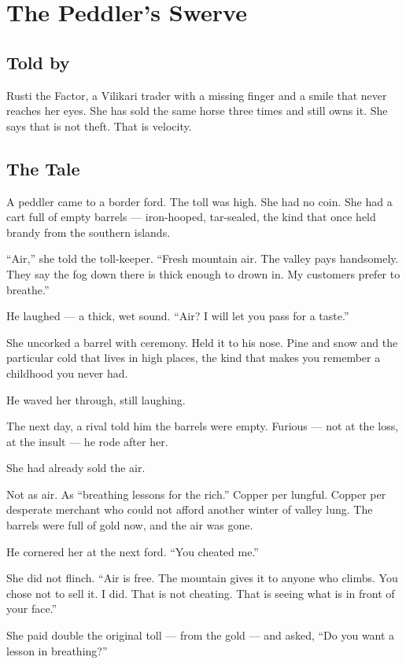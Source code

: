 \chapter{The Peddler's Swerve}

\section*{Told by}
Rusti the Factor, a Vilikari trader with a missing finger and a smile that never reaches her eyes. She has sold the same horse three times and still owns it. She says that is not theft. That is velocity.

\section*{The Tale}

A peddler came to a border ford. The toll was high. She had no coin. She had a cart full of empty barrels --- iron-hooped, tar-sealed, the kind that once held brandy from the southern islands.

``Air,'' she told the toll-keeper. ``Fresh mountain air. The valley pays handsomely. They say the fog down there is thick enough to drown in. My customers prefer to breathe.''

He laughed --- a thick, wet sound. ``Air? I will let you pass for a taste.''

She uncorked a barrel with ceremony. Held it to his nose. Pine and snow and the particular cold that lives in high places, the kind that makes you remember a childhood you never had.

He waved her through, still laughing.

The next day, a rival told him the barrels were empty. Furious --- not at the loss, at the insult --- he rode after her.

She had already sold the air.

Not as air. As ``breathing lessons for the rich.'' Copper per lungful. Copper per desperate merchant who could not afford another winter of valley lung. The barrels were full of gold now, and the air was gone.

He cornered her at the next ford. ``You cheated me.''

She did not flinch. ``Air is free. The mountain gives it to anyone who climbs. You chose not to sell it. I did. That is not cheating. That is seeing what is in front of your face.''

She paid double the original toll --- from the gold --- and asked, ``Do you want a lesson in breathing?''

